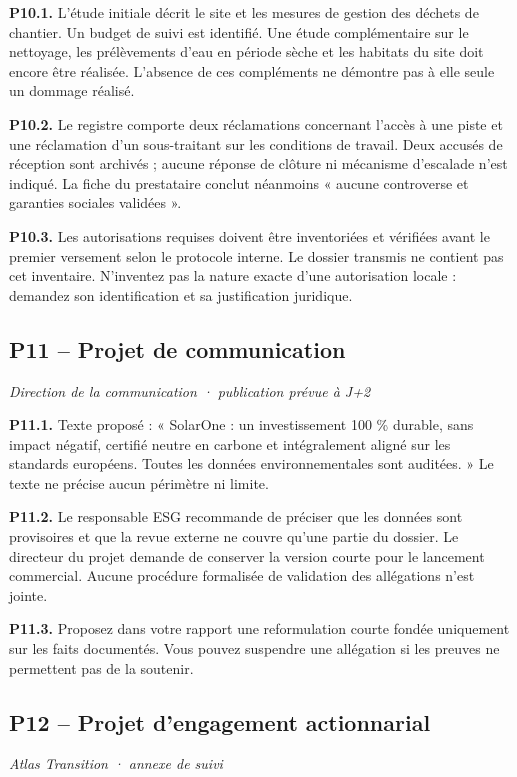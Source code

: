 \documentclass[11pt,a4paper]{article}
\begin{document}
\textbf{P10.1.} L’étude initiale décrit le site et les mesures de gestion des déchets de chantier. Un budget de suivi est identifié. Une étude complémentaire sur le nettoyage, les prélèvements d’eau en période sèche et les habitats du site doit encore être réalisée. L’absence de ces compléments ne démontre pas à elle seule un dommage réalisé.

\textbf{P10.2.} Le registre comporte deux réclamations concernant l’accès à une piste et une réclamation d’un sous-traitant sur les conditions de travail. Deux accusés de réception sont archivés ; aucune réponse de clôture ni mécanisme d’escalade n’est indiqué. La fiche du prestataire conclut néanmoins « aucune controverse et garanties sociales validées ».

\textbf{P10.3.} Les autorisations requises doivent être inventoriées et vérifiées avant le premier versement selon le protocole interne. Le dossier transmis ne contient pas cet inventaire. N’inventez pas la nature exacte d’une autorisation locale : demandez son identification et sa justification juridique.

\subsection{P11 -- Projet de communication}
\textit{Direction de la communication · publication prévue à J+2}

\textbf{P11.1.} Texte proposé : « SolarOne : un investissement 100 \% durable, sans impact négatif, certifié neutre en carbone et intégralement aligné sur les standards européens. Toutes les données environnementales sont auditées. » Le texte ne précise aucun périmètre ni limite.

\textbf{P11.2.} Le responsable ESG recommande de préciser que les données sont provisoires et que la revue externe ne couvre qu’une partie du dossier. Le directeur du projet demande de conserver la version courte pour le lancement commercial. Aucune procédure formalisée de validation des allégations n’est jointe.

\textbf{P11.3.} Proposez dans votre rapport une reformulation courte fondée uniquement sur les faits documentés. Vous pouvez suspendre une allégation si les preuves ne permettent pas de la soutenir.

\subsection{P12 -- Projet d’engagement actionnarial}
\textit{Atlas Transition · annexe de suivi}
\end{document}
